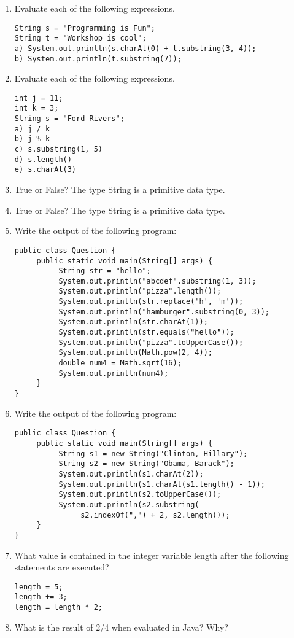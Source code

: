 \begin{enumerate}[label={\arabic{counter}\addtocounter{counter}{1}}.]
\item Evaluate each of the following expressions.
\begin{lstlisting}
String s = "Programming is Fun";
String t = "Workshop is cool";
a) System.out.println(s.charAt(0) + t.substring(3, 4));
b) System.out.println(t.substring(7));
\end{lstlisting}

\item Evaluate each of the following expressions.
\begin{lstlisting}
int j = 11;
int k = 3;
String s = "Ford Rivers";
a) j / k
b) j % k
c) s.substring(1, 5)
d) s.length()
e) s.charAt(3)
\end{lstlisting}

\item True or False? The type String is a primitive data type.

\item True or False? The type String is a primitive data type.

\item Write the output of the following program:
\begin{lstlisting}
public class Question {
     public static void main(String[] args) {
          String str = "hello";
          System.out.println("abcdef".substring(1, 3));
          System.out.println("pizza".length());
          System.out.println(str.replace('h', 'm'));
          System.out.println("hamburger".substring(0, 3));
          System.out.println(str.charAt(1));
          System.out.println(str.equals("hello"));
          System.out.println("pizza".toUpperCase());
          System.out.println(Math.pow(2, 4));
          double num4 = Math.sqrt(16);
          System.out.println(num4);
     }
}
\end{lstlisting}

\item Write the output of the following program:
\begin{lstlisting}
public class Question {
     public static void main(String[] args) {
          String s1 = new String("Clinton, Hillary");
          String s2 = new String("Obama, Barack");
          System.out.println(s1.charAt(2));
          System.out.println(s1.charAt(s1.length() - 1));
          System.out.println(s2.toUpperCase());
          System.out.println(s2.substring(
               s2.indexOf(",") + 2, s2.length());
     }
}
\end{lstlisting}

\item What value is contained in the integer variable length after the following statements are executed?
\begin{lstlisting}
length = 5;
length += 3;
length = length * 2;
\end{lstlisting}

\item What is the result of 2/4 when evaluated in Java? Why?

\end{enumerate}

